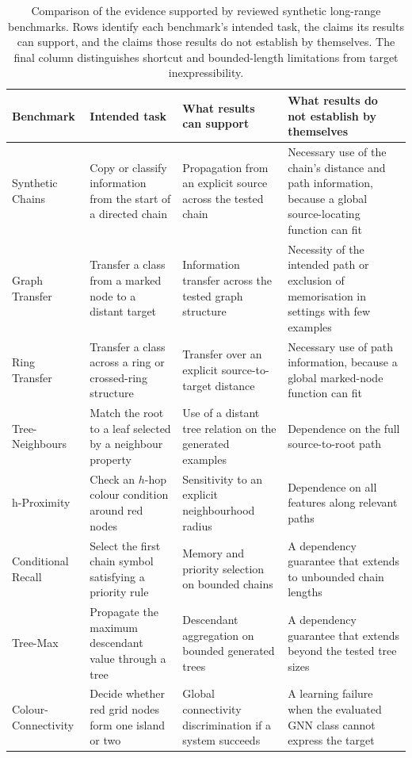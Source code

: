 \begin{table}[t]
\centering
\scriptsize
\setlength{\tabcolsep}{2pt}
\begin{tabular}{L{0.14\textwidth}L{0.22\textwidth}L{0.23\textwidth}L{0.29\textwidth}}
\hline
\textbf{Benchmark} & \textbf{Intended task} & \textbf{What results can support} & \textbf{What results do not establish by themselves} \\
\hline
Synthetic Chains & Copy or classify information from the start of a directed chain & Propagation from an explicit source across the tested chain & Necessary use of the chain's distance and path information, because a global source-locating function can fit \cite{gu2020implicit,zhou2025glora} \\
Graph Transfer & Transfer a class from a marked node to a distant target & Information transfer across the tested graph structure & Necessity of the intended path or exclusion of memorisation in settings with few examples \cite{digionvanni2023oversquashing,zhou2025glora} \\
Ring Transfer & Transfer a class across a ring or crossed-ring structure & Transfer over an explicit source-to-target distance & Necessary use of path information, because a global marked-node function can fit \cite{digionvanni2023oversquashing,gutteridge2023drew,zhou2025glora} \\
Tree-Neighbours & Match the root to a leaf selected by a neighbour property & Use of a distant tree relation on the generated examples & Dependence on the full source-to-root path \cite{alon2021bottleneck,zhou2025glora} \\
h-Proximity & Check an $h$-hop colour condition around red nodes & Sensitivity to an explicit neighbourhood radius & Dependence on all features along relevant paths \cite{abboud2022shortest,zhou2025glora} \\
Conditional Recall & Select the first chain symbol satisfying a priority rule & Memory and priority selection on bounded chains & A dependency guarantee that extends to unbounded chain lengths \cite{lukovnikov2021improving,zhou2025glora} \\
Tree-Max & Propagate the maximum descendant value through a tree & Descendant aggregation on bounded generated trees & A dependency guarantee that extends beyond the tested tree sizes \cite{lukovnikov2021improving,zhou2025glora} \\
Colour-Connectivity & Decide whether red grid nodes form one island or two & Global connectivity discrimination if a system succeeds & A learning failure when the evaluated GNN class cannot express the target \cite{rampasek2021hierarchical,zhou2025glora} \\
\hline
\end{tabular}
\caption{Comparison of the evidence supported by reviewed synthetic long-range benchmarks.
Rows identify each benchmark's intended task, the claims its results can support, and the claims those results do not establish by themselves.
The final column distinguishes shortcut and bounded-length limitations from target inexpressibility.}
\label{tab:sota-synthetic-benchmarks}
\end{table}

